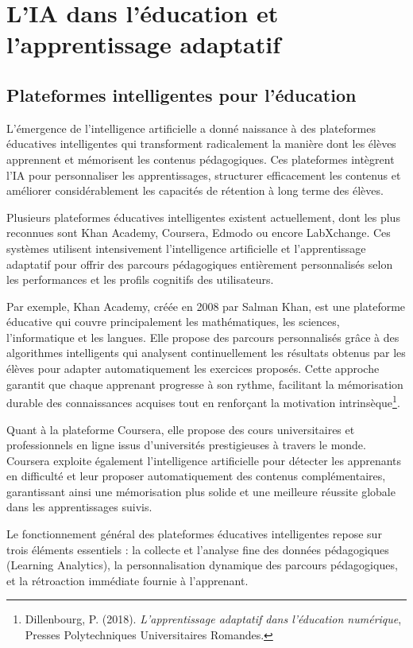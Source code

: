 \documentclass[11pt,a4paper]{report}
\begin{document}
\section{L’IA dans l’éducation et l’apprentissage adaptatif}

\subsection{Plateformes intelligentes pour l’éducation}

L’émergence de l’intelligence artificielle a donné naissance à des plateformes éducatives intelligentes qui transforment radicalement la manière dont les élèves apprennent et mémorisent les contenus pédagogiques. Ces plateformes intègrent l’IA pour personnaliser les apprentissages, structurer efficacement les contenus et améliorer considérablement les capacités de rétention à long terme des élèves.

Plusieurs plateformes éducatives intelligentes existent actuellement, dont les plus reconnues sont Khan Academy, Coursera, Edmodo ou encore LabXchange. Ces systèmes utilisent intensivement l’intelligence artificielle et l’apprentissage adaptatif pour offrir des parcours pédagogiques entièrement personnalisés selon les performances et les profils cognitifs des utilisateurs.

Par exemple, Khan Academy, créée en 2008 par Salman Khan, est une plateforme éducative qui couvre principalement les mathématiques, les sciences, l’informatique et les langues. Elle propose des parcours personnalisés grâce à des algorithmes intelligents qui analysent continuellement les résultats obtenus par les élèves pour adapter automatiquement les exercices proposés. Cette approche garantit que chaque apprenant progresse à son rythme, facilitant la mémorisation durable des connaissances acquises tout en renforçant la motivation intrinsèque\footnote{Dillenbourg, P. (2018). \textit{L’apprentissage adaptatif dans l’éducation numérique}, Presses Polytechniques Universitaires Romandes.}.

Quant à la plateforme Coursera, elle propose des cours universitaires et professionnels en ligne issus d’universités prestigieuses à travers le monde. Coursera exploite également l’intelligence artificielle pour détecter les apprenants en difficulté et leur proposer automatiquement des contenus complémentaires, garantissant ainsi une mémorisation plus solide et une meilleure réussite globale dans les apprentissages suivis.

Le fonctionnement général des plateformes éducatives intelligentes repose sur trois éléments essentiels : la collecte et l’analyse fine des données pédagogiques (Learning Analytics), la personnalisation dynamique des parcours pédagogiques, et la rétroaction immédiate fournie à l’apprenant.
\end{document}
